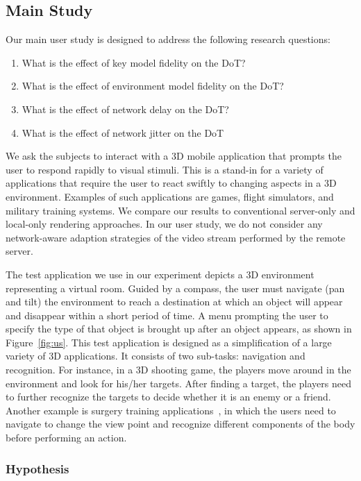 \subsection{Main Study}
\label{sec:hrr:us:ms}

Our main user study is designed to address the following research questions:
\begin{enumerate}
\item
What is the effect of key model fidelity on the DoT?
\item
What is the effect of environment model fidelity on the DoT?
\item
What is the effect of network delay on the DoT?
\item
What is the effect of network jitter on the DoT
\end{enumerate}

We ask the subjects to interact with a 3D mobile application that prompts the user to respond rapidly to visual stimuli. This is a stand-in for a variety of applications that require the user to react swiftly to changing aspects in a 3D environment. Examples of such applications are games, flight simulators, and military training systems. We compare our results to conventional server-only and local-only rendering approaches. In our user study, we do not consider any network-aware adaption strategies of the video stream performed by the remote server.

The test application we use in our experiment depicts a 3D environment representing a virtual room. Guided by a compass, the user must navigate (pan and tilt) the environment to reach a destination at which an object will appear and disappear within a short period of time.
A menu prompting the user to specify the type of that object is brought up after an object appears, as shown in Figure~\ref{fig:us}.
This test application is designed as a simplification of a large variety of 3D applications. It consists of two sub-tasks: navigation and recognition.
For instance, in a 3D shooting game, the players move around in the environment and look for his/her targets. After finding a target, the players need to further recognize the targets to decide whether it is an enemy or a friend.
Another example is surgery training applications~\cite{cecil2013}, in which the users need to navigate to change the view point and recognize different components of the body before performing an action.

\subsubsection{Hypothesis}
\label{sec:hrr:us:ms:h}

